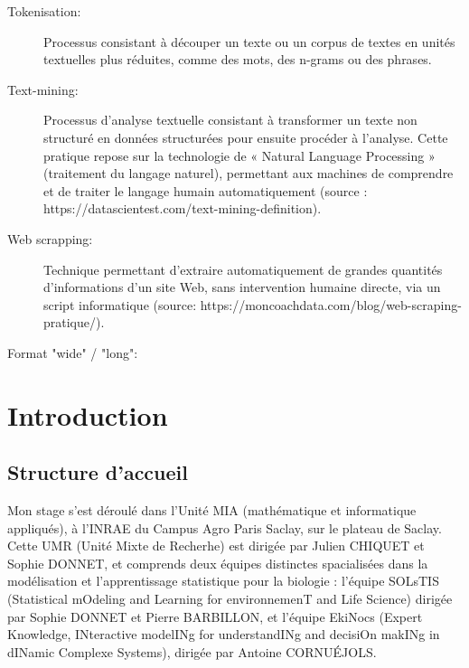 \documentclass{book}
\begin{document}
\begin{description}
    \item[Tokenisation:] Processus consistant à découper un texte ou un corpus
        de textes en unités textuelles plus réduites, comme des mots, des n-grams ou
        des phrases.

    \item[Text-mining:] Processus d'analyse textuelle consistant à transformer
        un texte non structuré en données structurées pour ensuite procéder à
        l’analyse. Cette pratique repose sur la technologie de « Natural Language
        Processing » (traitement du langage naturel), permettant aux machines de
        comprendre et de traiter le langage humain automatiquement (source :
        https://datascientest.com/text-mining-definition).

    \item[Web scrapping:] Technique permettant d’extraire automatiquement de
        grandes quantités d’informations d’un site Web, sans intervention humaine
        directe, via un script informatique (source:
        https://moncoachdata.com/blog/web-scraping-pratique/).

    \item[Format "wide" / "long":]

\end{description}
\thispagestyle{fancy}

\newpage
\mbox{} %
\thispagestyle{fancy}
\newpage


\newpage
\fancyhead[LE,RO]{\leftmark}
\chapter{\label{Premier Chapitre}Introduction}

\section{Structure d'accueil}
\noindent
Mon stage s'est déroulé dans l'Unité MIA (mathématique et informatique
appliqués), à l'INRAE du Campus Agro Paris Saclay, sur le plateau de Saclay.
Cette UMR (Unité Mixte de Recherhe) est dirigée par Julien CHIQUET et Sophie
DONNET, et comprends deux équipes distinctes spacialisées dans la modélisation
et l'apprentissage statistique pour la biologie : l'équipe SOLsTIS (Statistical
mOdeling and Learning for environnemenT and Life Science) dirigée par Sophie
DONNET et Pierre BARBILLON, et l'équipe EkiNocs (Expert Knowledge, INteractive
modelINg for understandINg and decisiOn makINg in dINamic Complexe Systems),
dirigée par Antoine CORNU\'{E}JOLS.
\end{document}
